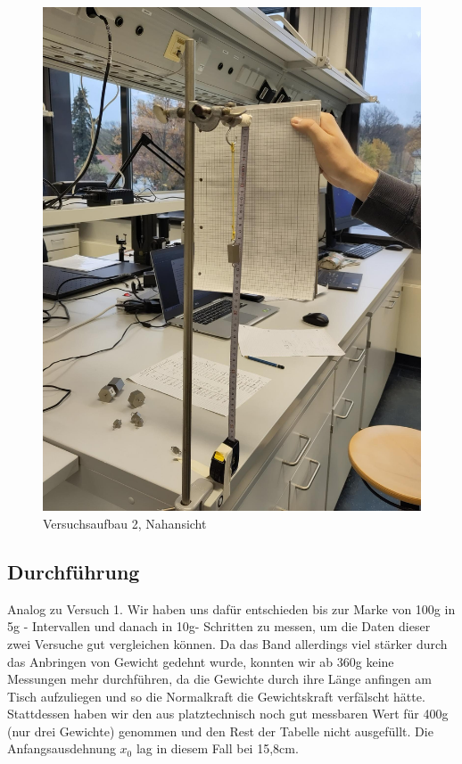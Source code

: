 \documentclass[
  9pt,
]{article}
\begin{document}
\begin{figure}
\centering
\includegraphics[width=\textwidth,height=0.2\textheight]{Bilder/V2B2.jpeg}
\caption{Versuchsaufbau 2, Nahansicht}
\end{figure}

\hypertarget{durchfuxfchrung-1}{%
\subsection{Durchführung}\label{durchfuxfchrung-1}}

Analog zu Versuch 1. Wir haben uns dafür entschieden bis zur Marke von
100g in 5g - Intervallen und danach in 10g- Schritten zu messen, um die
Daten dieser zwei Versuche gut vergleichen können. Da das Band
allerdings viel stärker durch das Anbringen von Gewicht gedehnt wurde,
konnten wir ab 360g keine Messungen mehr durchführen, da die Gewichte
durch ihre Länge anfingen am Tisch aufzuliegen und so die Normalkraft
die Gewichtskraft verfälscht hätte. Stattdessen haben wir den aus
platztechnisch noch gut messbaren Wert für 400g (nur drei Gewichte)
genommen und den Rest der Tabelle nicht ausgefüllt. Die
Anfangsausdehnung \(x_0\) lag in diesem Fall bei 15,8cm.
\end{document}

